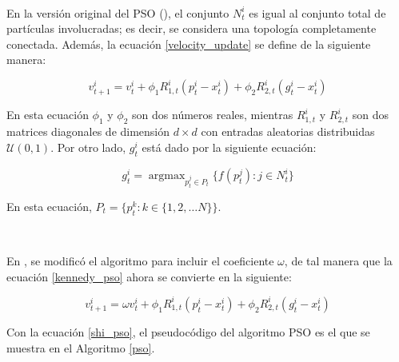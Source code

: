 \documentclass{article}
\DeclareMathOperator*{\argmax}{argmax}
\begin{document}
\

En la versión original del PSO (\cite{kennedy95}),  el conjunto $N_t^i$ es igual al conjunto total de partículas involucradas; es decir, se considera una topología completamente conectada. Además, la ecuación \ref{velocity_update} se define de la siguiente manera: 

\begin{equation}
    \label{kennedy_pso}
    v_{t + 1}^i = v_t^i + \phi_1 R_{1,t}^i(p_t^i- x_t^i) + \phi_2 R_{2,t}^i(g_t^i- x_t^i) 
\end{equation}{}

En esta ecuación $\phi_1$ y $\phi_2$ son dos números reales, mientras $R_{1,t}^i$ y $R_{2,t}^i$ son dos matrices diagonales de dimensión $d \times d$ con entradas aleatorias distribuidas $\mathcal{U}(0,1)$. Por otro lado, $g_t^i$ está dado por la siguiente ecuación:

\begin{equation}
    \label{gbest_update}
    g_t^i = \argmax_{p_{t}^j \in P_t}  \{f(p_{t}^j): j \in N_t^i\}
\end{equation}{}

En esta ecuación, $P_t = \{p_t^k : k \in \{1,2, \dots N\}\}$.

\ 

En \cite{shi98}, se modificó el algoritmo para incluir el coeficiente $\omega$, de tal manera que la ecuación \ref{kennedy_pso} ahora se convierte en la siguiente:

\begin{equation}
    \label{shi_pso}
    v_{t + 1}^i = \omega v_t^i + \phi_1 R_{1,t}^i(p_t^i- x_t^i) + \phi_2 R_{2,t}^i(g_t^i- x_t^i) 
\end{equation}{}

Con la ecuación \ref{shi_pso}, el pseudocódigo del algoritmo PSO es el que se muestra en el Algoritmo \ref{pso}.

\
\end{document}
